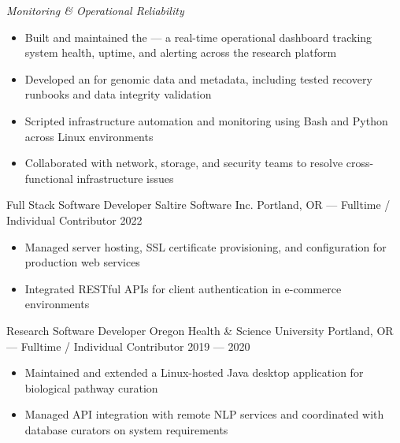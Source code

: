 \vspace{1em}

\emph{Monitoring \& Operational Reliability}

\begin{itemize}
    \item Built and maintained the  --- a real-time operational dashboard tracking system health, uptime, and alerting across the research platform
    \item Developed an  for genomic data and metadata, including tested recovery runbooks and data integrity validation
    \item Scripted infrastructure automation and monitoring using Bash and Python across Linux environments
    \item Collaborated with network, storage, and security teams to resolve cross-functional infrastructure issues
\end{itemize}

\newpage

\showoff
{Full Stack Software Developer}
{Saltire Software Inc.}
{Portland, OR --- Fulltime / Individual Contributor}
{2022}

\begin{itemize}
    \item Managed server hosting, SSL certificate provisioning, and configuration for production web services
    \item Integrated RESTful APIs for client authentication in e-commerce environments
\end{itemize}

\vspace*{\baselineskip}

\showoff
{Research Software Developer}
{Oregon Health \& Science University}
{Portland, OR --- Fulltime / Individual Contributor}
{2019 --- 2020}

\begin{itemize}
    \item Maintained and extended a Linux-hosted Java desktop application for biological pathway curation
    \item Managed API integration with remote NLP services and coordinated with database curators on system requirements
\end{itemize}





\vfill \myBreak{}


